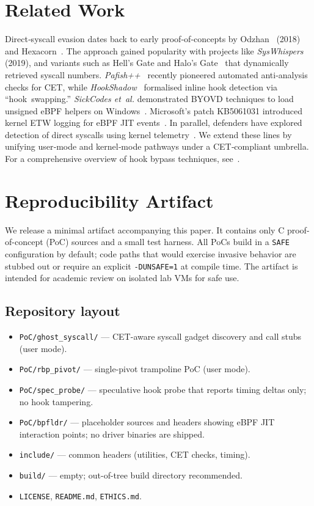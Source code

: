 \documentclass[11pt,letterpaper]{article}
\begin{document}
\section{Related Work}
\label{sec:related}
Direct‑syscall evasion dates back to early proof‑of‑concepts by Odzhan~\cite{Odzhan2018} (2018) and Hexacorn~\cite{Hexacorn2017}. The approach gained popularity with projects like \emph{SysWhispers}~\cite{SysWhispers2019} (2019), and variants such as Hell’s Gate and Halo’s Gate~\cite{Trickster2021} that dynamically retrieved syscall numbers. \emph{Pafish++}~\cite{Pafish2024} recently pioneered automated anti‑analysis checks for CET, while \emph{HookShadow}~\cite{HookShadow2023} formalised inline hook detection via “hook swapping.” \emph{SickCodes et al.} demonstrated BYOVD techniques to load unsigned eBPF helpers on Windows~\cite{SickCodes2024}. Microsoft’s patch KB5061031 introduced kernel ETW logging for eBPF JIT events~\cite{MSFT2025}. In parallel, defenders have explored detection of direct syscalls using kernel telemetry~\cite{Chechik2024}. We extend these lines by unifying user‑mode and kernel‑mode pathways under a CET‑compliant umbrella. For a comprehensive overview of hook bypass techniques, see \cite{MDSec2020}.

\section{Reproducibility Artifact}
\label{sec:repro}
We release a minimal artifact accompanying this paper. It contains only C proof-of-concept (PoC) sources and a small test harness. All PoCs build in a \texttt{SAFE} configuration by default; code paths that would exercise invasive behavior are stubbed out or require an explicit \texttt{-DUNSAFE=1} at compile time. The artifact is intended for academic review on isolated lab VMs for safe use.

\subsection{Repository layout}
\begin{itemize}
  \item \texttt{PoC/ghost\_syscall/} — CET-aware syscall gadget discovery and call stubs (user mode).
  \item \texttt{PoC/rbp\_pivot/} — single-pivot trampoline PoC (user mode).
  \item \texttt{PoC/spec\_probe/} — speculative hook probe that reports timing deltas only; no hook tampering.
  \item \texttt{PoC/bpfldr/} — placeholder sources and headers showing eBPF JIT interaction points; no driver binaries are shipped.
  \item \texttt{include/} — common headers (utilities, CET checks, timing).
  \item \texttt{build/} — empty; out-of-tree build directory recommended.
  \item \texttt{LICENSE}, \texttt{README.md}, \texttt{ETHICS.md}.
\end{itemize}
\end{document}
